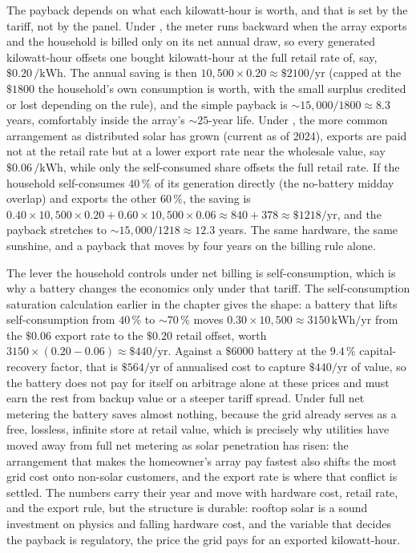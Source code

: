 The payback depends on what each kilowatt-hour is worth, and that is set by the
tariff, not by the panel. Under , the meter runs
backward when the array exports and the household is billed only on its net
annual draw, so every generated kilowatt-hour offsets one bought kilowatt-hour
at the full retail rate of, say, $\$0.20\,\si{\per\kilo\watt\hour}$. The annual
saving is then $10{,}500 \times 0.20 \approx \$2100/\text{yr}$ (capped at the
$\$1800$ the household's own consumption is worth, with the small surplus
credited or lost depending on the rule), and the simple payback is $\sim
15{,}000/1800 \approx 8.3$ years, comfortably inside the array's $\sim
25$-year life. Under , the more common arrangement as
distributed solar has grown (current as of 2024), exports are paid not at the
retail rate but at a lower export rate near the wholesale value, say $\$0.06\,
\si{\per\kilo\watt\hour}$, while only the self-consumed share offsets the full
retail rate. If the household self-consumes $40\,\%$ of its generation directly
(the no-battery midday overlap) and exports the other $60\,\%$, the saving is
$0.40\times 10{,}500\times 0.20 + 0.60\times 10{,}500\times 0.06 \approx 840 +
378 \approx \$1218/\text{yr}$, and the payback stretches to $\sim 15{,}000/1218
\approx 12.3$ years. The same hardware, the same sunshine, and a payback that
moves by four years on the billing rule alone.

The lever the household controls under net billing is self-consumption, which
is why a battery changes the economics only under that tariff. The
self-consumption saturation calculation earlier in the chapter gives the shape:
a battery that lifts self-consumption from $40\,\%$ to $\sim 70\,\%$ moves
$0.30\times 10{,}500 \approx 3150\,\si{\kilo\watt\hour}/\text{yr}$ from the
$\$0.06$ export rate to the $\$0.20$ retail offset, worth $3150\times(0.20 -
0.06) \approx \$440/\text{yr}$. Against a $\$6000$ battery at the
$9.4\,\%$ capital-recovery factor, that is $\$564/\text{yr}$ of annualised cost
to capture $\$440/\text{yr}$ of value, so the battery does not pay for itself
on arbitrage alone at these prices and must earn the rest from backup value or
a steeper tariff spread. Under full net metering the battery saves almost
nothing, because the grid already serves as a free, lossless, infinite store
at retail value, which is precisely why utilities have moved away from full net
metering as solar penetration has risen: the arrangement that makes the
homeowner's array pay fastest also shifts the most grid cost onto
non-solar customers, and the export rate is where that conflict is settled.
The numbers carry their year and move with hardware cost, retail rate, and the
export rule, but the structure is durable: rooftop solar is a sound investment
on physics and falling hardware cost, and the variable that decides the
payback is regulatory, the price the grid pays for an exported kilowatt-hour.

